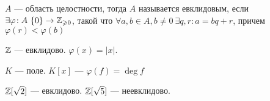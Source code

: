 \begin{definition}
    $A$ --- область целостности, тогда  $A$ называется евклидовым, если  $\exists \varphi\!: A \ \{0\} \to \mathbb{Z}_{\geqslant 0}$, такой что $\forall a, b \in A, b \neq 0\ \exists q, r\!: a=bq+r$, причем  $\varphi(r) < \varphi(b)$
\end{definition}
\begin{example}
    $\mathbb{Z}$ --- евклидово.  $\varphi(x) = |x|$.
\end{example}
\begin{example}
    $K$ --- поле.  $K[x]$ --- $\varphi(f) = \deg f$
\end{example}
\begin{example}
    $\mathbb{Z}[\sqrt{2}]$ --- евклидово. $\mathbb{Z}[\sqrt{5}]$ --- неевклидово.
\end{example}
